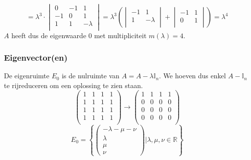 \documentclass[lineaire_algebra_oplossingen.tex]{subfiles}
\begin{document}
\[
= \lambda^3\cdot
\begin{vmatrix}
0 & -1 & 1\\
-1 & 0 & 1\\
1 & 1 & -\lambda\\
\end{vmatrix}
=
\lambda^3
\left(
\begin{vmatrix}
-1 & 1\\
1 & -\lambda\\
\end{vmatrix}
+
\begin{vmatrix}
-1 & 1\\
0 & 1\\
\end{vmatrix}
\right)
=
\lambda^4
\]
$A$ heeft dus de eigenwaarde $0$ met multipliciteit $m(\lambda) = 4$.

\subsubsection*{Eigenvector(en)}
De eigenruimte $E_0$ is de nulruimte van $A = A-\lambda\mathbb{I}_n$. We hoeven dus enkel $A-\mathbb{I}_n$ te rijreduceren om een oplossing te zien staan.
\[
\begin{pmatrix}
1 & 1 & 1 & 1\\
1 & 1 & 1 & 1\\
1 & 1 & 1 & 1\\
1 & 1 & 1 & 1\\
\end{pmatrix}
\rightarrow
\begin{pmatrix}
1 & 1 & 1 & 1\\
0 & 0 & 0 & 0\\
0 & 0 & 0 & 0\\
0 & 0 & 0 & 0\\
\end{pmatrix}
\]
\[
E_0 = 
\left\lbrace
\begin{pmatrix}
-\lambda-\mu-\nu\\\lambda\\\mu\\\nu
\end{pmatrix}
| \lambda,\mu,\nu\in\mathbb{R}
\right\rbrace
\]
\end{document}
